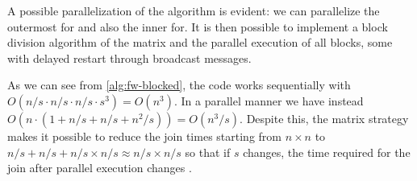 
A possible parallelization of the algorithm is evident: we can parallelize the outermost for and also the inner for.
It is then possible to implement a block division algorithm of the matrix and the parallel execution of all blocks, some with delayed restart through broadcast messages.

As we can see from \cref{alg:fw-blocked}, the code works sequentially with \(O(n/s \cdot n/s \cdot n/s \cdot s^3) =O(n^3) \).
In a parallel manner we have instead \(O(n \cdot (1+n/s+n/s+ n^2/s)) = O(n^3/s)\).
Despite this, the matrix strategy makes it possible to reduce the join times starting from \(n\times n\) to \(n/s + n/s + n/s \times n/s \approx n/s \times n/s\) so that if \(s\) changes, the time required for the join after parallel execution changes \cite{rucci}.

\FloatBarrier
